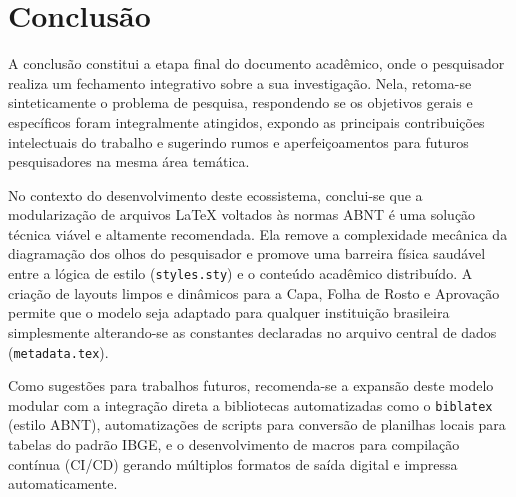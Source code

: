 
\chapter{Conclusão}

A conclusão constitui a etapa final do documento acadêmico, onde o pesquisador realiza um fechamento integrativo sobre a sua investigação. Nela, retoma-se sinteticamente o problema de pesquisa, respondendo se os objetivos gerais e específicos foram integralmente atingidos, expondo as principais contribuições intelectuais do trabalho e sugerindo rumos e aperfeiçoamentos para futuros pesquisadores na mesma área temática.

No contexto do desenvolvimento deste ecossistema, conclui-se que a modularização de arquivos LaTeX voltados às normas ABNT é uma solução técnica viável e altamente recomendada. Ela remove a complexidade mecânica da diagramação dos olhos do pesquisador e promove uma barreira física saudável entre a lógica de estilo (\texttt{styles.sty}) e o conteúdo acadêmico distribuído. A criação de layouts limpos e dinâmicos para a Capa, Folha de Rosto e Aprovação permite que o modelo seja adaptado para qualquer instituição brasileira simplesmente alterando-se as constantes declaradas no arquivo central de dados (\texttt{metadata.tex}).

Como sugestões para trabalhos futuros, recomenda-se a expansão deste modelo modular com a integração direta a bibliotecas automatizadas como o \texttt{biblatex} (estilo ABNT), automatizações de scripts para conversão de planilhas locais para tabelas do padrão IBGE, e o desenvolvimento de macros para compilação contínua (CI/CD) gerando múltiplos formatos de saída digital e impressa automaticamente.
